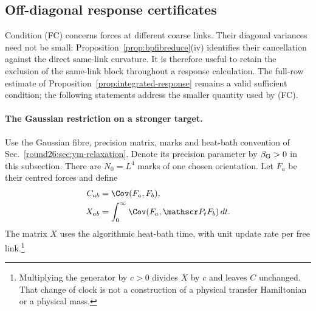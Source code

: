 \subsection{Off-diagonal response certificates}
\label{ssec:r42off}

Condition (FC) concerns forces at different coarse links. Their diagonal
variances need not be small: Proposition~\ref{prop:bpfibreduce}(iv)
identifies their cancellation against the direct same-link curvature.
It is therefore useful to retain the exclusion of the same-link block
throughout a response calculation. The full-row estimate of
Proposition~\ref{prop:integrated-response} remains a valid sufficient
condition; the following statements address the smaller quantity used
by (FC).

\paragraph{The Gaussian restriction on a stronger target.}
Use the Gaussian fibre, precision matrix, marks and heat-bath convention
of Sec.~\ref{round26:sec:ym-relaxation}. Denote its precision parameter by
$\beta_{\rm G}>0$ in this subsection. There are $N_0=L^4$ marks of one
chosen orientation. Let $F_a$ be their centred forces and define
\begin{align}
 C_{ab}&=\Cov(F_a,F_b),\nonumber\\
 X_{ab}&=\int_0^\infty\Cov(F_a,\mathscr P_tF_b)\,dt.
 \label{eq:r42cx}
\end{align}
The matrix $X$ uses the algorithmic heat-bath time, with unit update
rate per free link.\footnote{Multiplying the generator by $c>0$ divides
$X$ by $c$ and leaves $C$ unchanged. That change of clock is not a
construction of a physical transfer Hamiltonian or a physical mass.}


